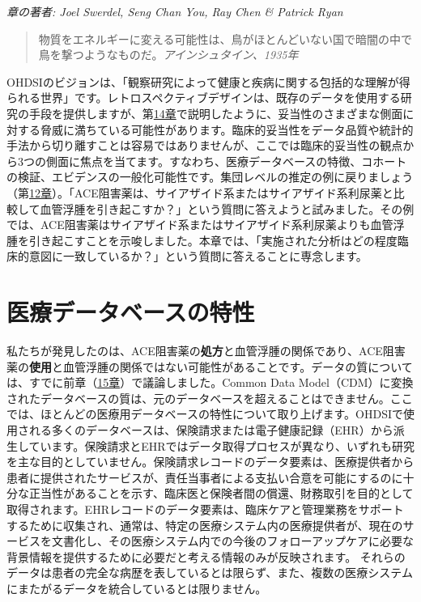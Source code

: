 \documentclass[
  11pt]{book}
\theoremstyle{definition}
\theoremstyle{definition}
\theoremstyle{definition}
\theoremstyle{definition}
\theoremstyle{remark}
\begin{document}
\emph{章の著者: Joel Swerdel, Seng Chan You, Ray Chen \& Patrick Ryan}

\begin{quote}
物質をエネルギーに変える可能性は、鳥がほとんどいない国で暗闇の中で鳥を撃つようなものだ。\emph{アインシュタイン、1935年}
\end{quote}

OHDSIのビジョンは、「観察研究によって健康と疾病に関する包括的な理解が得られる世界」です。レトロスペクティブデザインは、既存のデータを使用する研究の手段を提供しますが、第\href{https://ohdsi.github.io/TheBookOfOhdsi/EvidenceQuality.html\#EvidenceQuality}{14章}で説明したように、妥当性のさまざまな側面に対する脅威に満ちている可能性があります。臨床的妥当性をデータ品質や統計的手法から切り離すことは容易ではありませんが、ここでは臨床的妥当性の観点から3つの側面に焦点を当てます。すなわち、医療データベースの特徴、コホートの検証、エビデンスの一般化可能性です。集団レベルの推定の例に戻りましょう（第\href{https://ohdsi.github.io/TheBookOfOhdsi/PopulationLevelEstimation.html\#PopulationLevelEstimation}{12章}）。「ACE阻害薬は、サイアザイド系またはサイアザイド系利尿薬と比較して血管浮腫を引き起こすか？」という質問に答えようと試みました。その例では、ACE阻害薬はサイアザイド系またはサイアザイド系利尿薬よりも血管浮腫を引き起こすことを示唆しました。本章では、「実施された分析はどの程度臨床的意図に一致しているか？」という質問に答えることに専念します。

\section{医療データベースの特性}\label{CharacteristicsOfDatabase}

私たちが発見したのは、ACE阻害薬の\textbf{処方}と血管浮腫の関係であり、ACE阻害薬の\textbf{使用}と血管浮腫の関係ではない可能性があることです。データの質については、すでに前章（\href{https://ohdsi.github.io/TheBookOfOhdsi/DataQuality.html\#DataQuality}{15章}）で議論しました。Common Data Model（CDM）に変換されたデータベースの質は、元のデータベースを超えることはできません。ここでは、ほとんどの医療用データベースの特性について取り上げます。OHDSIで使用される多くのデータベースは、保険請求または電子健康記録（EHR）から派生しています。保険請求とEHRではデータ取得プロセスが異なり、いずれも研究を主な目的としていません。保険請求レコードのデータ要素は、医療提供者から患者に提供されたサービスが、責任当事者による支払い合意を可能にするのに十分な正当性があることを示す、臨床医と保険者間の償還、財務取引を目的として取得されます。EHRレコードのデータ要素は、臨床ケアと管理業務をサポートするために収集され、通常は、特定の医療システム内の医療提供者が、現在のサービスを文書化し、その医療システム内での今後のフォローアップケアに必要な背景情報を提供するために必要だと考える情報のみが反映されます。 それらのデータは患者の完全な病歴を表しているとは限らず、また、複数の医療システムにまたがるデータを統合しているとは限りません。
\end{document}

